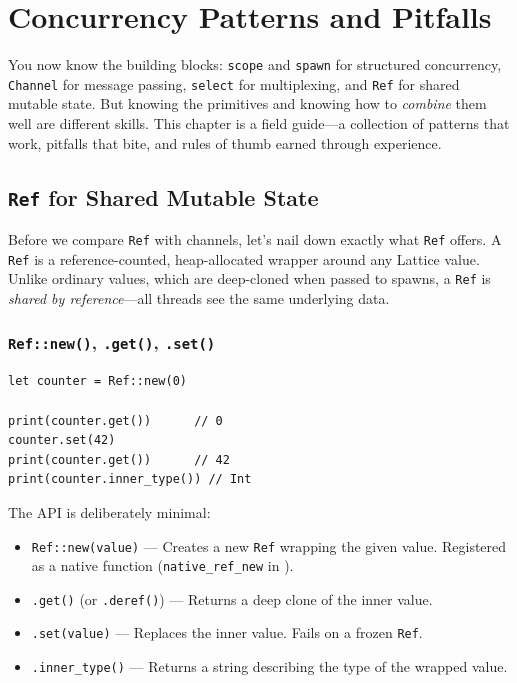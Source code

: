 \chapter{Concurrency Patterns and Pitfalls}\label{ch:concurrency-patterns}


You now know the building blocks: \lstinline|scope| and \lstinline|spawn| for structured concurrency, \lstinline|Channel| for message passing, \lstinline|select| for multiplexing, and \lstinline|Ref| for shared mutable state.
But knowing the primitives and knowing how to \emph{combine} them well are different skills.
This chapter is a field guide---a collection of patterns that work, pitfalls that bite, and rules of thumb earned through experience.

\section{\texttt{Ref} for Shared Mutable State}\label{sec:ref-shared-state}


Before we compare \lstinline|Ref| with channels, let's nail down exactly what \lstinline|Ref| offers.
A \lstinline|Ref| is a reference-counted, heap-allocated wrapper around any Lattice value.
Unlike ordinary values, which are deep-cloned when passed to spawns, a \lstinline|Ref| is \emph{shared by reference}---all threads see the same underlying data.

\subsection{\texttt{Ref::new()}, \texttt{.get()}, \texttt{.set()}}


\begin{lstlisting}[language=Lattice, caption={Ref basics}]
let counter = Ref::new(0)

print(counter.get())      // 0
counter.set(42)
print(counter.get())      // 42
print(counter.inner_type()) // Int
\end{lstlisting}

The API is deliberately minimal:

\begin{itemize}
  \item \lstinline|Ref::new(value)| --- Creates a new \lstinline|Ref| wrapping the given value. Registered as a native function (\texttt{native\_ref\_new} in ).
  \item \lstinline|.get()| (or \lstinline|.deref()|) --- Returns a deep clone of the inner value.
  \item \lstinline|.set(value)| --- Replaces the inner value. Fails on a frozen \lstinline|Ref|.
  \item \lstinline|.inner_type()| --- Returns a string describing the type of the wrapped value.
\end{itemize}

